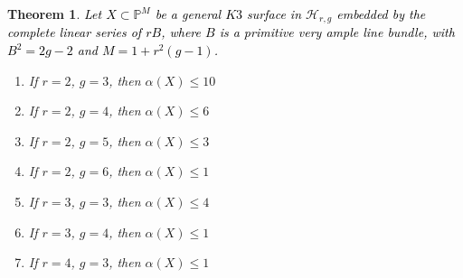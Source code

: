 \documentclass[11pt,twoside]{amsart}
\theoremstyle{plain}
\numberwithin{equation}{section}
\newtheorem{theorem}{Theorem}[section]
\theoremstyle{definition}
\begin{document}
\begin{theorem}\label{ZL for lower genus $K3$ surfaces}
\textcolor{black}{Let $X \subset \mathbb{P}^{M}$ be a general $K3$ surface in $\mathcal{H}_{r,g}$ embedded by the complete linear series of $rB$, where $B$ is a primitive very ample line bundle, with $B^2 = 2g-2$ and $M = 1+r^2(g-1)$.}
 
    \begin{enumerate}
        \item \label{2,3} If $r = 2$, $g = 3$, then $\alpha(X) \leq 10$ %
        \item \label{2,4} If $r = 2$, $g = 4$, then $\alpha(X) \leq 6$ 
        \item \label{2,5} If $r = 2$, $g = 5$, then $\alpha(X) \leq 3$ 
        \item \label{2,6} If $r = 2$, $g = 6$, then $\alpha(X) \leq 1$ 
        \item \label{3,3} If $r = 3$, $g = 3$, then $\alpha(X) \leq 4$
        \item \label{3,4} If $r = 3$, $g = 4$, then $\alpha(X) \leq 1$ 
        \item \label{4,3} If $r = 4$, $g = 3$, then $\alpha(X) \leq 1$
        
       
        
    \end{enumerate}
    
\end{theorem}
\end{document}
